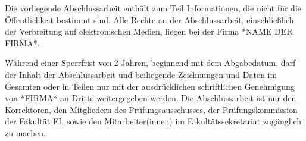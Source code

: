 


Die vorliegende Abschlussarbeit enthält zum Teil Informationen, die nicht für die Öffentlichkeit bestimmt sind. Alle Rechte an der Abschlussarbeit, einschließlich der Verbreitung auf elektronischen Medien, liegen bei der Firma *NAME DER FIRMA*.

Während einer Sperrfrist von 2 Jahren, beginnend mit dem Abgabedatum, darf der Inhalt der Abschlussarbeit und beiliegende Zeichnungen und Daten im Gesamten oder in Teilen nur mit der ausdrücklichen schriftlichen Genehmigung von *FIRMA* an Dritte weitergegeben werden. Die Abschlussarbeit ist nur den Korrektoren, den Mitgliedern des Prüfungsausschusses, der Prüfungskommission der Fakultät EI, sowie den Mitarbeiter(innen) im Fakultätssekretariat zugänglich zu machen.